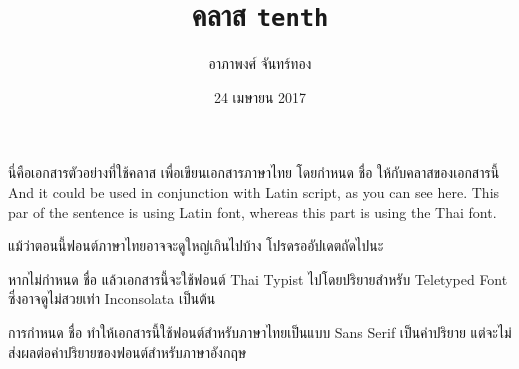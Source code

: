 \documentclass[10pt,twoside,thai,sansthai,notypist]{tenth}
\title{คลาส \texttt{tenth}}
\author{อาภาพงศ์ จันทร์ทอง}
\date{24 เมษายน 2017}
\begin{document}
    \maketitle

    นี่คือเอกสารตัวอย่างที่ใช้คลาส  เพื่อเขียนเอกสารภาษาไทย โดยกำหนด  ชื่อ  ให้กับคลาสของเอกสารนี้ \textlatin{And it could be used in conjunction with Latin script, as you can see here. This par of the sentence is using Latin font,} whereas this part is using the Thai font.

    แม้ว่าตอนนี้ฟอนต์ภาษาไทยอาจจะดูใหญ่เกินไปบ้าง โปรดรออัปเดตถัดไปนะ

    หากไม่กำหนด  ชื่อ  แล้วเอกสารนี้จะใช้ฟอนต์ Thai Typist ไปโดยปริยายสำหรับ Teletyped Font ซึ่งอาจดูไม่สวยเท่า Inconsolata เป็นต้น

    การกำหนด  ชื่อ  ทำให้เอกสารนี้ใช้ฟอนต์สำหรับภาษาไทยเป็นแบบ Sans Serif เป็นค่าปริยาย แต่จะไม่ส่งผลต่อค่าปริยายของฟอนต์สำหรับภาษาอังกฤษ
\end{document}
